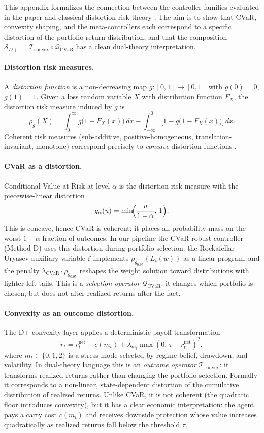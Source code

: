 \documentclass[11pt]{article}
\begin{document}
This appendix formalizes the connection between the controller families
evaluated in the paper and classical distortion-risk theory
\cite{yaari1987,schmeidler1989,wang2000}. The aim is to show that CVaR,
convexity shaping, and the meta-controllers each correspond to a specific
distortion of the portfolio return distribution, and that the composition
$\mathcal{S}_{D+}=\mathcal{T}_{\text{convex}}\circ\mathcal{Q}_{\text{CVaR}}$
has a clean dual-theory interpretation.

\paragraph{Distortion risk measures.}
A \emph{distortion function} is a non-decreasing map $g:[0,1]\to[0,1]$ with
$g(0)=0$, $g(1)=1$. Given a loss random variable $X$ with distribution
function $F_X$, the distortion risk measure induced by $g$ is
\[
\rho_g(X)=\int_0^\infty g\bigl(1-F_X(x)\bigr)\,dx
  -\int_{-\infty}^0\bigl[1-g\bigl(1-F_X(x)\bigr)\bigr]\,dx.
\]
Coherent risk measures (sub-additive, positive-homogeneous, translation-invariant,
monotone) correspond precisely to \emph{concave} distortion functions
\cite{wang2000}.

\paragraph{CVaR as a distortion.}
Conditional Value-at-Risk at level $\alpha$ is the distortion risk measure
with the piecewise-linear distortion
\[
g_{\alpha}(u)=\min\!\Bigl(\frac{u}{1-\alpha},\,1\Bigr).
\]
This is concave, hence CVaR is coherent; it places all probability mass on
the worst $1{-}\alpha$ fraction of outcomes. In our pipeline the CVaR-robust
controller (Method D) uses this distortion during portfolio selection:
the Rockafellar--Uryasev auxiliary variable $\zeta$ implements
$\rho_{g_{0.95}}(L_t(w))$ as a linear program, and the penalty
$\lambda_{\text{CVaR}}\cdot\rho_{g_{0.95}}$ reshapes the weight solution
toward distributions with lighter left tails. This is a \emph{selection
operator} $\mathcal{Q}_{\text{CVaR}}$: it changes which portfolio is
chosen, but does not alter realized returns after the fact.

\paragraph{Convexity as an outcome distortion.}
The D+ convexity layer applies a deterministic payoff transformation
\[
\tilde{r}_t = r_t^{\text{net}} - c(m_t)
  + \lambda_{m_t}\max(0,\,\tau-r_t^{\text{net}})^2,
\]
where $m_t\in\{0,1,2\}$ is a stress mode selected by regime belief,
drawdown, and volatility. In dual-theory language this is an \emph{outcome
operator} $\mathcal{T}_{\text{convex}}$: it transforms realized returns
rather than changing the portfolio selection. Formally it corresponds to a
non-linear, state-dependent distortion of the cumulative distribution of
realized returns. Unlike CVaR, it is not coherent (the quadratic floor
introduces convexity), but it has a clear economic interpretation: the
agent pays a carry cost $c(m_t)$ and receives downside protection whose
value increases quadratically as realized returns fall below the threshold
$\tau$.
\end{document}
